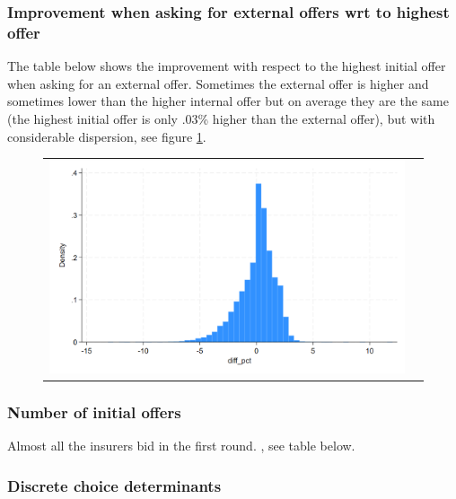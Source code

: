 \documentclass[12pt]{article}
\begin{document}
\subsubsection{Improvement when asking for external offers wrt to highest offer}

The table below shows the improvement with respect to the highest initial offer when asking for an external offer. Sometimes the external offer is higher and sometimes lower than the higher internal offer but on average they are the same (the highest initial offer is only .03\% higher than the external offer), but with considerable dispersion, see figure \ref{fig:ie3_6}. 





\begin{figure}[H]
\caption{}
\label{fig:ie3_6}
\centering{}%
\begin{tabular}{cc}
\includegraphics[scale=0.27]{../figures/IE3_offer_change_max_internal.png}
\end{tabular}
\end{figure}


\subsubsection{Number of initial offers}


Almost all the insurers bid in the first round. , see table below.



\subsubsection{Discrete choice determinants}
\end{document}
